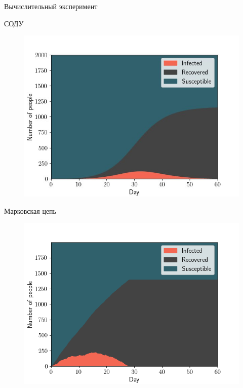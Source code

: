 \documentclass[aspectratio=169]{beamer}
\begin{document}
\begin{frame}{Вычислительный эксперимент}
\begin{center}
    \begin{minipage}[t]{0.47\columnwidth}
        \begin{center}
            СОДУ
        \end{center}
        \vspace{-0.5cm}
		\begin{figure}
			\centering
			\includegraphics[width=\linewidth]{slides/SIR_2.jpeg}
		\end{figure}
	\end{minipage}
	\begin{minipage}[t]{0.47\columnwidth}
        \begin{center}
            Марковская цепь
        \end{center}
        \vspace{-0.5cm}
		\begin{figure}
			\centering
			\includegraphics[width=\linewidth]{slides/stochSIR_2.png}
		\end{figure}
	\end{minipage}
\end{center}
\end{frame}
\end{document}
